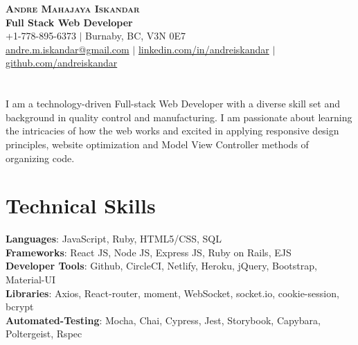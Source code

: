 \documentclass[letterpaper,10.5pt]{article}
\begin{document}

\begin{center}
    \textbf{\Huge \scshape Andre Mahajaya Iskandar} \\ \vspace{5pt}
    \textbf{\large Full Stack Web Developer}\vspace{5pt} \\
    \small \faPhoneSquare{ }+1-778-895-6373 $|$ \faHome{ }Burnaby, BC, V3N 0E7 \\
    \href{mailto:andre.m.iskandar@gmail.com}{\faEnvelope{ }andre.m.iskandar@gmail.com} $|$ 
    \href{https://linkedin.com/in/andreiskandar}{\faLinkedin{ }linkedin.com/in/andreiskandar} $|$
    \href{https://github.com/andreiskandar}{\faGithub{ }github.com/andreiskandar} \vspace{-10pt}
\end{center}

\section{}
I am a technology-driven Full-stack Web Developer with a diverse skill set and background in quality control and manufacturing. I am passionate about learning the intricacies of how the web works and excited in applying responsive design principles, website optimization and Model View Controller methods of organizing code. 

\section{Technical Skills}


 \begin{itemize}[leftmargin=0.15in, label={}]
    \small{\item{
     \textbf{Languages}{: JavaScript, Ruby, HTML5/CSS, SQL} \\
     \textbf{Frameworks}{: React JS, Node JS, Express JS, Ruby on Rails, EJS} \\
     \textbf{Developer Tools}{: Github, CircleCI, Netlify, Heroku, jQuery, Bootstrap, Material-UI} \\
     \textbf{Libraries}{: Axios, React-router, moment, WebSocket, socket.io, cookie-session, bcrypt } \\
     \textbf{Automated-Testing}{: Mocha, Chai, Cypress, Jest, Storybook, Capybara, Poltergeist, Rspec }
    }}
 \end{itemize}
\end{document}
